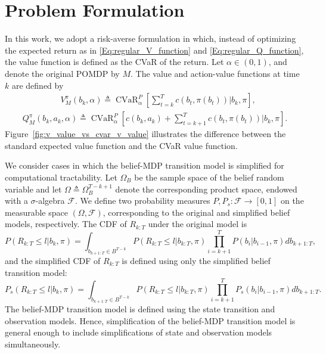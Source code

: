 \documentclass[acmlarge, manuscript, screen, review, natbib=false, oneside]{acmart}
\DeclareMathOperator{\CVaR}{CVaR}
\begin{document}
\section{Problem Formulation}

In this work, we adopt a risk-averse formulation in which, instead of optimizing the expected return as in \eqref{Eq:regular_V_function} and \eqref{Eq:regular_Q_function}, the value function is defined as the CVaR of the return. Let $\alpha \in (0,1)$, and denote the original POMDP by $M$. The value and action-value functions at time $k$ are defined by
\begin{equation}\label{Eq:cvar_value_function_def}
	\begin{aligned}
		&V^{\pi}_{M}(b_k,\alpha) \! \triangleq \! \CVaR_\alpha^P[\sum_{t=k}^T \! c(b_t, \pi(b_t))|b_k, \pi],
	\end{aligned}
\end{equation}
\begin{equation}\label{Eq:cvar_Q_function_def}
	\begin{aligned}
		Q^{\pi}_{M}(b_k, a_k, \alpha)
		\triangleq \CVaR_\alpha^P[c(b_k, a_k)
		+ \sum_{t=k+1}^T c(b_t, \pi(b_t))|b_k, \pi].
	\end{aligned}
\end{equation}
Figure~\ref{fig:v_value_vs_cvar_v_value} illustrates the difference between the standard expected value function and the CVaR value function.

We consider cases in which the belief-MDP transition model is simplified for computational tractability. Let $\Omega_B$ be the sample space of the belief random variable and let $\Omega \triangleq \Omega_B^{T-k+1}$ denote the corresponding product space, endowed with a $\sigma$-algebra $\mathcal{F}$. We define two probability measures $P, P_s : \mathcal{F} \to [0,1]$ on the measurable space $(\Omega,\mathcal{F})$, corresponding to the original and simplified belief models, respectively. The CDF of $R_{k:T}$ under the original model is
\begin{equation}\label{eq:OriginalCDFReturn}
		P(R_{k:T}\leq l|b_k,\pi) = \int_{b_{k+1:T} \in B^{T-k}} \!\! P(R_{k:T}\leq l|b_{k:T},\pi)
		\prod_{i=k+1}^T P(b_i|b_{i-1},\pi)db_{k+1:T},
\end{equation}
and the simplified CDF of $R_{k:T}$ is defined using only the simplified belief transition model:
\begin{equation}\label{eq:SimplifiedCDFReturn}
		P_s(R_{k:T}\leq l|b_k,\pi) = \int_{b_{k+1:T} \in B^{T-k}} \!\! P(R_{k:T}\leq l|b_{k:T},\pi)
		\prod_{i=k+1}^T P_s(b_i|b_{i-1},\pi)db_{k+1:T}.
\end{equation}
The belief-MDP transition model is defined using the state transition and observation models. Hence, simplification of the belief-MDP transition model is general enough to include simplifications of state and observation models simultaneously.
\end{document}
